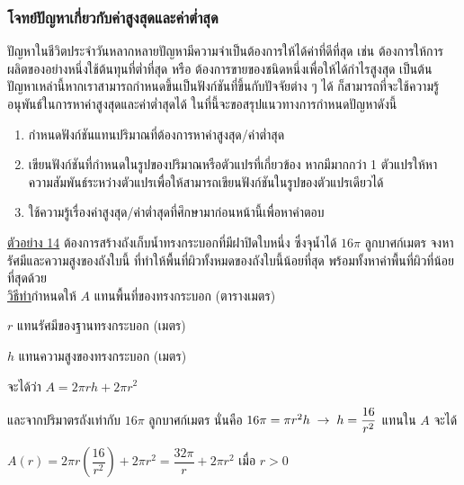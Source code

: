 \documentclass[hidelinks,12pt,a4paper]{article}
\newcommand{\s}{\space}
\begin{document}
\subsubsection{โจทย์ปัญหาเกี่ยวกับค่าสูงสุดและค่าต่ำสุด}
ปัญหาในชีวิตประจำวันหลากหลายปัญหามีความจำเป็นต้องการให้ได้ค่าที่ดีที่สุด เช่น ต้องการให้การผลิตของอย่างหนึ่งใช้ต้นทุนที่ต่ำที่สุด หรือ ต้องการขายของชนิดหนึ่งเพื่อให้ได้กำไรสูงสุด เป็นต้น ปัญหาเหล่านี้หากเราสามารถกำหนดขึ้นเป็นฟังก์ชันที่ขึ้นกับปัจจัยต่าง ๆ ได้ ก็สามารถที่จะใช้ความรู้อนุพันธ์ในการหาค่าสูงสุดและค่าต่ำสุดได้ ในที่นี้จะขอสรุปแนวทางการกำหนดปัญหาดังนี้
\begin{enumerate}
    \renewcommand{\labelenumi}{\Roman{enumi}.}
    \item กำหนดฟังก์ชันแทนปริมาณที่ต้องการหาค่าสูงสุด/ค่าต่ำสุด
    \item เขียนฟังก์ชันที่กำหนดในรูปของปริมาณหรือตัวแปรที่เกี่ยวข้อง หากมีมากกว่า 1 ตัวแปรให้หาความสัมพันธ์ระหว่างตัวแปรเพื่อให้สามารถเขียนฟังก์ชันในรูปของตัวแปรเดียวได้
    \item ใช้ความรู้เรื่องค่าสูงสุด/ค่าต่ำสุดที่ศึกษามาก่อนหน้านี้เพื่อหาคำตอบ
\end{enumerate}

\vspace{2mm}
\underline{ตัวอย่าง 14} ต้องการสร้างถังเก็บน้ำทรงกระบอกที่มีฝาปิดใบหนึ่ง ซึ่งจุน้ำได้ $16\pi$ ลูกบาศก์เมตร จงหารัศมีและความสูงของถังใบนี้ ที่ทำให้พื้นที่ผิวทั้งหมดของถังใบนี้น้อยที่สุด พร้อมทั้งหาค่าพื้นที่ผิวที่น้อยที่สุดด้วย\\[1ex]
\underline{\underline{วิธีทำ}}\hspace{8mm}กำหนดให้ $A$ แทนพื้นที่ของทรงกระบอก (ตารางเมตร)

\hspace{31mm} $r$ แทนรัศมีของฐานทรงกระบอก (เมตร)

\hspace{31mm} $h$ แทนความสูงของทรงกระบอก (เมตร)

\hspace{15mm} จะได้ว่า \s $A=2\pi rh+2\pi r^2$

\hspace{15mm} และจากปริมาตรถังเท่ากับ $16\pi$ ลูกบาศก์เมตร นั่นคือ \s $16\pi=\pi r^2h \hspace{1mm} \rightarrow \hspace{1mm} h=\dfrac{16}{r^2}$ \s แทนใน $A$ จะได้

\hspace{15mm} $A(r)=2\pi r \left(\dfrac{16}{r^2}\right)+2\pi r^2 = \dfrac{32\pi}{r}+2\pi r^2$ \s เมื่อ \s $r>0$
\end{document}
